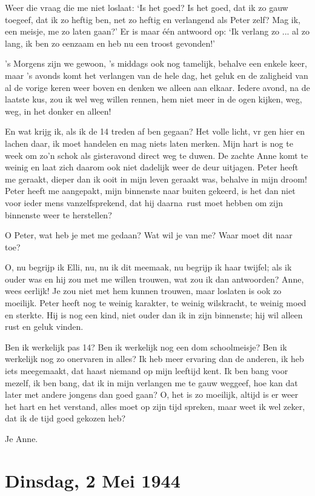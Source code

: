 \documentclass{book}
\begin{document}
Weer die vraag die me niet loslaat: `Is het goed? Is het goed, dat ik zo gauw
toegeef, dat ik zo heftig ben, net zo heftig en verlangend als Peter zelf? Mag
ik, een meisje, me zo laten gaan?' Er is maar één antwoord op: `Ik verlang zo
... al zo lang, ik ben zo eenzaam en heb nu een troost gevonden!'

's Morgens zijn we gewoon, 's middags ook nog tamelijk, behalve een enkele keer,
maar 's avonds komt het verlangen van de hele dag, het geluk en de zaligheid van
al de vorige keren weer boven en denken we alleen aan elkaar. Iedere avond, na
de laatste kus, zou ik wel weg willen rennen, hem niet meer in de ogen kijken,
weg, weg, in het donker en alleen!

En wat krijg ik, als ik de 14 treden af ben gegaan? Het volle licht, vr gen hier
en lachen daar, ik moet handelen en mag niets laten merken.  Mijn hart is nog te
week om zo'n schok als gisteravond direct weg te duwen. De zachte Anne komt te
weinig en laat zich daarom ook niet dadelijk weer de deur uitjagen. Peter heeft
me geraakt, dieper dan ik ooit in mijn leven geraakt was, behalve in mijn droom!
Peter heeft me aangepakt, mijn binnenste naar buiten gekeerd, is het dan niet
voor ieder mens vanzelfsprekend, dat hij daarna~rust moet hebben om zijn
binnenste weer te herstellen?

O Peter, wat heb je met me gedaan? Wat wil je van me? Waar moet dit naar toe?

O, nu begrijp ik Elli, nu, nu ik dit meemaak, nu begrijp ik haar twijfel; als ik
ouder was en hij zou met me willen trouwen, wat zou ik dan antwoorden? Anne,
wees eerlijk! Je zou niet met hem kunnen trouwen, maar loslaten is ook zo
moeilijk. Peter heeft nog te weinig karakter, te weinig wilskracht, te weinig
moed en sterkte. Hij is nog een kind, niet ouder dan ik in zijn binnenste; hij
wil alleen rust en geluk vinden.

Ben ik werkelijk pas 14? Ben ik werkelijk nog een dom schoolmeisje? Ben ik
werkelijk nog zo onervaren in alles? Ik heb meer ervaring dan de anderen, ik heb
iets meegemaakt, dat haast niemand op mijn leeftijd kent. Ik ben bang voor
mezelf, ik ben bang, dat ik in mijn verlangen me te gauw weggeef, hoe kan dat
later met andere jongens dan goed gaan? O, het is zo moeilijk, altijd is er weer
het hart en het verstand, alles moet op zijn tijd spreken, maar weet ik wel
zeker, dat ik de tijd goed gekozen heb?

Je Anne.

\section*{Dinsdag, 2 Mei 1944}
\end{document}

